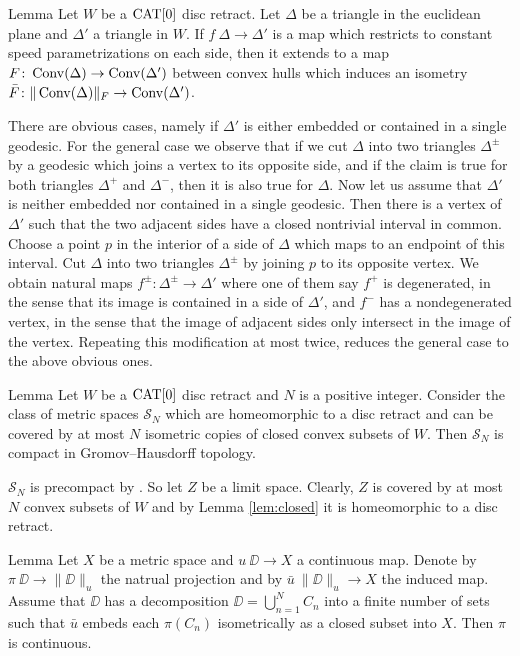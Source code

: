 \documentclass[a4paper,10pt]{amsart}
\begin{document}
\begin{thm}{Lemma}\label{lem:isomtri}
Let $W$ be a $\mathop{\rm CAT}\nolimits[0]$ disc retract. 
Let $\Delta$ be a triangle in the euclidean plane
and $\Delta'$ a triangle in $W$. 
If $f\:\Delta\to \Delta'$ is a map which restricts to constant speed
parametrizations on each side, then it extends to a map 
$F\colon\mathop{\rm Conv}\nolimits(\Delta)\to \mathop{\rm Conv}\nolimits(\Delta')$ between convex hulls which induces an isometry $\bar F\colon\|\mathop{\rm Conv}\nolimits(\Delta)\|_F\to \mathop{\rm Conv}\nolimits(\Delta')$. 
\end{thm}

There are obvious cases, namely if $\Delta'$ is either embedded or contained in a single geodesic. 
For the general case we observe that if we cut $\Delta$ into two triangles $\Delta^\pm$ by a geodesic which joins a vertex to its opposite side, and if 
the claim is true for both triangles $\Delta^+$ and $\Delta^-$, then it is also true for $\Delta$. Now let us assume that $\Delta'$ is neither embedded nor contained
in a single geodesic. Then there is a vertex of $\Delta'$ such that the two adjacent sides have a closed nontrivial interval in common. Choose a point $p$ in the interior
of a side of $\Delta$ which maps to an endpoint of this interval. Cut $\Delta$ into two triangles $\Delta^\pm$ by joining $p$ to its opposite vertex.
We obtain natural maps $f^\pm:\Delta^\pm\to\Delta'$ where one of them say $f^+$ is degenerated, in the sense that its image is contained in a side of $\Delta'$, and $f^-$ has 
a nondegenerated vertex, in the sense that the image of adjacent sides only intersect in the image of the vertex. Repeating this modification at most twice,
reduces the general case to the above obvious ones.
\qeds

\begin{thm}{Lemma}\label{lem:puzzle-compact}
Let $W$ be a $\mathop{\rm CAT}\nolimits[0]$ disc retract 
and $N$ is a positive integer. 
Consider the class of metric spaces $\mathcal{S}_N$ 
which are homeomorphic to a disc retract
and can be covered by at most $N$ isometric copies of closed convex subsets of $W$.
Then $\mathcal{S}_N$ is compact in Gromov--Hausdorff topology.
\end{thm}

$\mathcal{S}_N$ is precompact by \cite[7.4.15]{BBI}. So let $Z$ be a limit space. Clearly, $Z$
is covered by at most $N$ convex subsets of 
$W$ and by Lemma \ref{lem:closed} it is homeomorphic to a disc retract.
\qeds

\begin{thm}{Lemma}\label{lem:proj-continuous}
Let $X$ be a metric space and $u\:\DD\to X$ a continuous map. Denote by $\pi\:\DD\to \|\DD\|_u$ the natrual projection and
by $\bar u\:\|\DD\|_u\to X$ the induced map. Assume that $\DD$ has a decomposition $\DD=\bigcup_{n=1}^N C_n$ into a finite 
number of sets such that $\bar u$ embeds each $\pi(C_n)$ isometrically as a closed subset into $X$. Then $\pi$
is continuous.
\end{thm}
\end{document}
